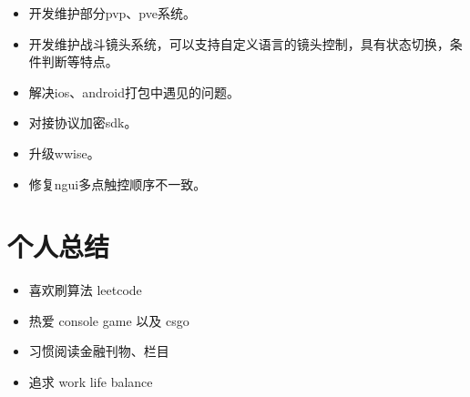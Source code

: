\documentclass{resume}
\begin{document}
\begin{itemize}
  \item 开发维护部分pvp、pve系统。
  \item 开发维护战斗镜头系统，可以支持自定义语言的镜头控制，具有状态切换，条件判断等特点。
  \item 解决ios、android打包中遇见的问题。
  \item 对接协议加密sdk。
  \item 升级wwise。
  \item 修复ngui多点触控顺序不一致。
\end{itemize}


\section{个人总结}
\begin{itemize}[parsep=0.2ex]
  \item 喜欢刷算法 leetcode
  \item 热爱 console game 以及 csgo
  \item 习惯阅读金融刊物、栏目
  \item 追求 work life balance
\end{itemize}

%
%
\end{document}

